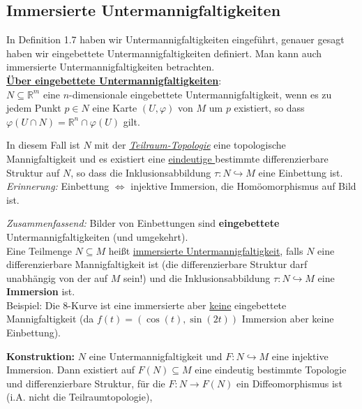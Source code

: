 \documentclass[fleqn, 12pt, letterpaper]{article}
\begin{document}
\subsection{Immersierte Untermannigfaltigkeiten}

In Definition 1.7 haben wir Untermannigfaltigkeiten eingeführt, genauer gesagt haben wir eingebettete Untermannigfaltigkeiten definiert. Man kann auch immersierte Untermannigfaltigkeiten betrachten.\\

\underline{\textbf{Über eingebettete Untermannigfaltigkeiten}}:\\

\( N \subseteq \mathbb{R}^m \) eine \( n \)-dimensionale eingebettete Untermannigfaltigkeit, wenn es zu jedem Punkt \( p \in N \) eine Karte \( (U, \varphi) \) von \( M \) um \( p \) existiert, so dass \( \varphi(U \cap N) = \mathbb{R}^n \cap \varphi(U) \) gilt.

In diesem Fall ist \( N \) mit der \textit{\underline{Teilraum-Topologie}} eine topologische Mannigfaltigkeit und es existiert eine \underline{eindeutige } bestimmte differenzierbare Struktur auf \( N \), so dass die Inklusionsabbildung \( \tau : N \hookrightarrow M \) eine Einbettung ist.\\

\textit{Erinnerung:} Einbettung \( \Longleftrightarrow \) injektive Immersion, die Homöomorphismus auf Bild ist.

\textit{Zusammenfassend:} Bilder von Einbettungen sind \textbf{eingebettete} Untermannigfaltigkeiten (und umgekehrt).\\

Eine Teilmenge \( N \subseteq M \) heißt \underline{immersierte Untermannigfaltigkeit}, falls \( N \) eine differenzierbare Mannigfaltigkeit ist (die differenzierbare Struktur darf unabhängig von der auf \( M \) sein!) und die Inklusionsabbildung \( \tau : N \hookrightarrow M \) eine \textbf{Immersion} ist.\\

Beispiel: Die 8-Kurve ist eine immersierte aber \underline{keine} eingebettete Mannigfaltigkeit (da $f(t)=(\cos(t),\sin(2t))$ Immersion aber keine Einbettung).

\textbf{Konstruktion:} \( N \) eine Untermannigfaltigkeit und \( F : N \hookrightarrow M \) eine injektive Immersion. Dann existiert auf \( F(N) \subseteq M \) eine eindeutig bestimmte Topologie und differenzierbare Struktur, für die \( F : N \to F(N) \) ein Diffeomorphismus ist (i.A. nicht die  Teilraumtopologie),\\
\end{document}
